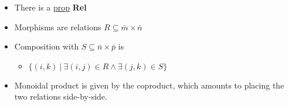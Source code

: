 \begin{itemize}
    \item There is a \href{doc/1 math/Seven Sketches in Compositionality/Chapter 5: Signal flow graphs/2 Props and presentations/1 Props - definition and first examples/1 Prop}{prop} \textbf{Rel}
    \item Morphisms are relations $R \subseteq \bar m \times \bar n$
    \item Composition with $S \subseteq \bar n \times \bar p$ is
          \begin{itemize}
            \item $\{(i, k)\ |\  \exists (i, j) \in R \land \exists (j,k) \in S\}$
          \end{itemize}
    \item Monoidal product is given by the coproduct, which amounts to placing the two relations side-by-side.
  \end{itemize}